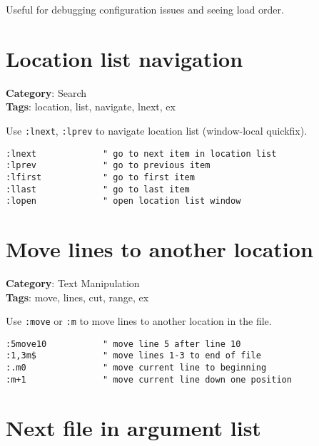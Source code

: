 {{{{{Useful for debugging configuration issues and seeing load order.

\section{Location list navigation}

\textbf{Category}: Search\\ \textbf{Tags}: location, list, navigate, lnext, ex
\vspace{0.5cm}

Use {\footnotesize \Verb§:lnext§}, {\footnotesize \Verb§:lprev§} to navigate location list (window-local quickfix).

\begin{Exa*}{}
\begin{Verbatim}[fontsize=\footnotesize, breaklines, breakanywhere]
:lnext             " go to next item in location list
:lprev             " go to previous item
:lfirst            " go to first item
:llast             " go to last item
:lopen             " open location list window
\end{Verbatim}
\end{Exa*}

\section{Move lines to another location}

\textbf{Category}: Text Manipulation\\ \textbf{Tags}: move, lines, cut, range, ex
\vspace{0.5cm}

Use {\footnotesize \Verb§:move§} or {\footnotesize \Verb§:m§} to move lines to another location in the file.

\begin{Exa*}{}
\begin{Verbatim}[fontsize=\footnotesize, breaklines, breakanywhere]
:5move10           " move line 5 after line 10
:1,3m$             " move lines 1-3 to end of file
:.m0               " move current line to beginning
:m+1               " move current line down one position
\end{Verbatim}
\end{Exa*}

\section{Next file in argument list}

}}}}}
